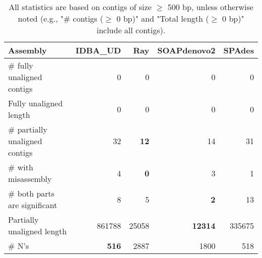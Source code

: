 \documentclass[12pt,a4paper]{article}
\begin{document}
\begin{table}[ht]
\begin{center}
\caption{All statistics are based on contigs of size $\geq$ 500 bp, unless otherwise noted (e.g., "\# contigs ($\geq$ 0 bp)" and "Total length ($\geq$ 0 bp)" include all contigs).}
\begin{tabular}{|l*{4}{|r}|}
\hline
Assembly & IDBA\_UD & Ray & SOAPdenovo2 & SPAdes \\ \hline
\# fully unaligned contigs & 0 & 0 & 0 & 0 \\ \hline
Fully unaligned length & 0 & 0 & 0 & 0 \\ \hline
\# partially unaligned contigs & 32 & {\bf 12} & 14 & 31 \\ \hline
\hspace{5mm}\# with misassembly & 4 & {\bf 0} & 3 & 1 \\ \hline
\hspace{5mm}\# both parts are significant & 8 & 5 & {\bf 2} & 13 \\ \hline
Partially unaligned length & 861788 & 25058 & {\bf 12314} & 335675 \\ \hline
\# N's & {\bf 516} & 2887 & 1800 & 518 \\ \hline
\end{tabular}
\end{center}
\end{table}
\end{document}
